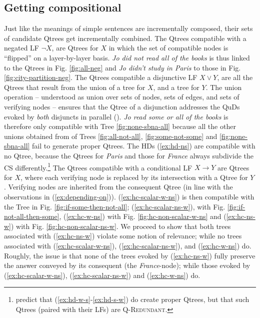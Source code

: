 	\subsection{Getting compositional}
	Just like the meanings of simple sentences are incrementally composed, their sets of candidate Qtrees get incrementally combined. The Qtrees compatible with a negated LF $\neg X$, are Qtrees for $X$ in which the set of compatible nodes is ``flipped'' on a layer-by-layer basis. \textit{Jo did not read all of the books} is thus linked to the Qtrees in Fig. \ref{fig:all-neg} and \textit{Jo didn't study in Paris} to those in Fig. \ref{fig:city-partition-neg}. The Qtrees compatible a disjunctive LF $X \vee Y$, are all the Qtrees that result from the union of a tree for $X$, and a tree for $Y$. The union operation -- understood as union over sets of nodes, sets of edges, and sets of verifying nodes -- ensures that the Qtree of a disjunction addresses the QuDs evoked by \textit{both} disjuncts in parallel (\cite{Simons2001,Zhang2024}). \textit{Jo read some or all of the books} is therefore only compatible with Tree \ref{fig:none-sbna-all} because all the other unions obtained from of Trees \ref{fig:all-not-all}, \ref{fig:some-not-some} and \ref{fig:none-sbna-all} fail to generate proper Qtrees. The HDs (\ref{ex:hd-ns}) are compatible with no Qtree, because the Qtrees for \textit{Paris} and those for \textit{France} always subdivide the CS differently.\footnote{\citet{HenotMortier2024a,HenotMortier2024b} predict that (\ref{ex:hd-w-s}-\ref{ex:hd-s-w}) do create proper Qtrees, but that such Qtrees (paired with their LFs) are \textsc{Q-Redundant}.} The Qtrees compatible with a conditional LF $X\rightarrow Y$ are Qtrees for $X$, where each verifying node is replaced by its intersection with a Qtree for $Y$. Verifying nodes are inherited from the consequent Qtree (in line with the observations in (\ref{ex:depending-on})). (\ref{ex:hc-scalar-w-ns}) is then compatible with the Tree in Fig. \ref{fig:if-some-then-not-all}; (\ref{ex:hc-scalar-ns-w}), with Fig. \ref{fig:if-not-all-then-some}, (\ref{ex:hc-w-ns}) with Fig. \ref{fig:hc-non-scalar-w-ns} and (\ref{ex:hc-ns-w}) with Fig. \ref{fig:hc-non-scalar-ns-w}. We proceed to show that both trees associated with (\ref{ex:hc-ns-w}) violate some notion of relevance; while no trees associated with (\ref{ex:hc-scalar-w-ns}), (\ref{ex:hc-scalar-ns-w}), and (\ref{ex:hc-w-ns}) do. Roughly, the issue is that none of the trees evoked by (\ref{ex:hc-ns-w}) fully preserve the answer conveyed by its consequent (the \textit{France}-node); while those evoked by (\ref{ex:hc-scalar-w-ns}), (\ref{ex:hc-scalar-ns-w}) and (\ref{ex:hc-w-ns}) do.
	

